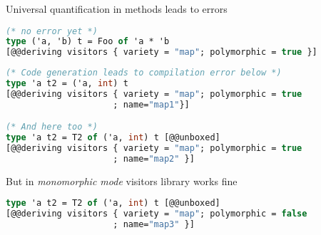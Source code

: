 \documentclass{beamer}
\theoremstyle{definition}
\theoremstyle{plain} %
\begin{document}
\begin{comment}
Although universal quantification of methods in `visitors` enables (it seems to) support 
of non-regular
data types, it creates a few issues with type abbrevations. In examples below
the first one is processed as expected. 
(NEXT SLIDE) The 2nd and 3rd ones lead to compilation error 
that we can... let's say repair...  by removing manually quantifiers from the 
method types in generated code. 
(NEXT SLIDE)
Then issue appears only in `polymorphic mode`, in monomorphic mode visitors works as 
expected. We want these examples to work as it is (because of some legacy code)
so we decided to upgrade our old work about the topic instead of changing the code
to make `visitors` applicable.

Also, in `visitors` some transformations (more precisely: `fold`) are available only in monomorphic mode. Our work doesn't have this restriction.
\end{comment}

\begin{frame}[fragile]{Universal quantification in methods leads to errors}
\begin{lstlisting}[language=ocaml] 
(* no error yet *)
type ('a, 'b) t = Foo of 'a * 'b  
[@@deriving visitors { variety = "map"; polymorphic = true }]
\end{lstlisting}
\pause
\begin{lstlisting}[language=ocaml] 
(* Code generation leads to compilation error below *)
type 'a t2 = ('a, int) t 
[@@deriving visitors { variety = "map"; polymorphic = true
                     ; name="map1"}]

(* And here too *)
type 'a t2 = T2 of ('a, int) t [@@unboxed]
[@@deriving visitors { variety = "map"; polymorphic = true
                     ; name="map2" }]
\end{lstlisting}\pause
But in \textit{monomorphic mode} visitors library works fine
\begin{lstlisting}[language=ocaml] 
type 'a t2 = T2 of ('a, int) t [@@unboxed]
[@@deriving visitors { variety = "map"; polymorphic = false
                     ; name="map3" }]
\end{lstlisting}
\end{frame}
\end{document}
